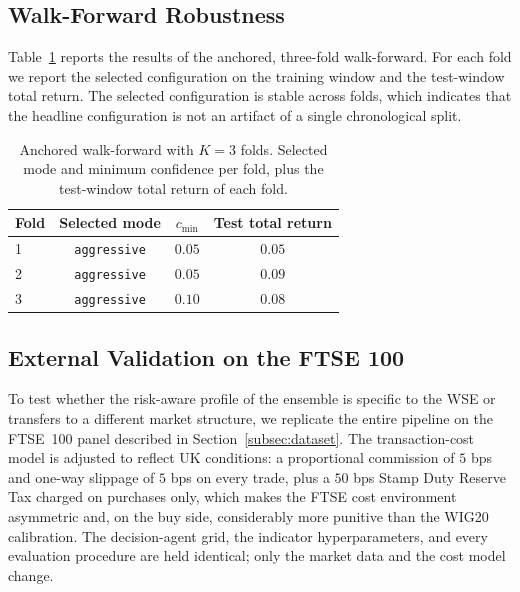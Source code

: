 \documentclass{ieeeaccess}
\begin{document}
\subsection{Walk-Forward Robustness}
\label{subsec:kfold}

Table~\ref{tab:kfold} reports the results of the anchored, three-fold walk-forward. For each fold we report the selected configuration on the training window and the test-window total return. The selected configuration is stable across folds, which indicates that the headline configuration is not an artifact of a single chronological split.

\begin{table}[t]
\centering
\caption{Anchored walk-forward with $K = 3$ folds. Selected mode and minimum confidence per fold, plus the test-window total return of each fold.}
\label{tab:kfold}
\begin{tabular}{lccc}
\toprule
Fold & Selected mode & $c_{\min}$ & Test total return \\
\midrule
1 & \texttt{aggressive} & $0.05$ & $0.05$ \\
2 & \texttt{aggressive} & $0.05$ & $0.09$ \\
3 & \texttt{aggressive} & $0.10$ & $0.08$ \\
\bottomrule
\end{tabular}
\end{table}

\subsection{External Validation on the FTSE 100}
\label{subsec:ftse}

To test whether the risk-aware profile of the ensemble is specific to the WSE or transfers to a different market structure, we replicate the entire pipeline on the FTSE~100 panel described in Section~\ref{subsec:dataset}. The transaction-cost model is adjusted to reflect UK conditions: a proportional commission of $5$ bps and one-way slippage of $5$ bps on every trade, plus a $50$ bps Stamp Duty Reserve Tax charged on purchases only, which makes the FTSE cost environment asymmetric and, on the buy side, considerably more punitive than the WIG20 calibration. The decision-agent grid, the indicator hyperparameters, and every evaluation procedure are held identical; only the market data and the cost model change.
\end{document}
